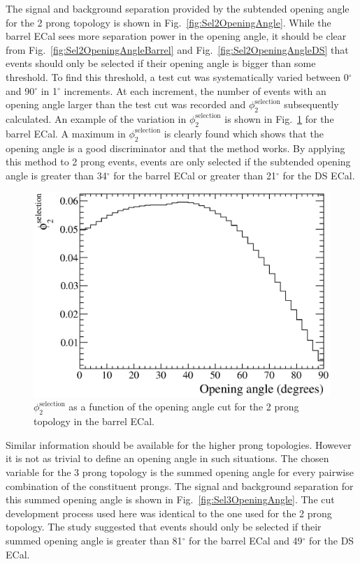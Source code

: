 The signal and background separation provided by the subtended opening angle for the 2 prong topology is shown in Fig.~\ref{fig:Sel2OpeningAngle}.  While the barrel ECal sees more separation power in the opening angle, it should be clear from Fig.~\ref{fig:Sel2OpeningAngleBarrel} and Fig.~\ref{fig:Sel2OpeningAngleDS} that events should only be selected if their opening angle is bigger than some threshold.  To find this threshold, a test cut was systematically varied between 0$^\circ$ and 90$^\circ$ in 1$^\circ$ increments.  At each increment, the number of events with an opening angle larger than the test cut was recorded and $\phi_2^{\textrm{selection}}$ subsequently calculated.  An example of the variation in $\phi_2^{\textrm{selection}}$ is shown in Fig.~\ref{fig:Sel2OpeningAngleBarrelFOM} for the barrel ECal.  A maximum in $\phi_2^{\textrm{selection}}$ is clearly found which shows that the opening angle is a good discriminator and that the method works.  By applying this method to 2 prong events, events are only selected if the subtended opening angle is greater than 34$^\circ$ for the barrel ECal or greater than 21$^\circ$ for the DS ECal.
\begin{figure}
  \centering
  \includegraphics[width=12cm]{images/selection/mc_selection/OpeningAngle_FOM_2Prong_Barrel.eps}
  \caption{$\phi_2^{\textrm{selection}}$ as a function of the opening angle cut for the 2 prong topology in the barrel ECal.}
  \label{fig:Sel2OpeningAngleBarrelFOM}
\end{figure}
Similar information should be available for the higher prong topologies.  However it is not as trivial to define an opening angle in such situations.  The chosen variable for the 3 prong topology is the summed opening angle for every pairwise combination of the constituent prongs.  The signal and background separation for this summed opening angle is shown in Fig.~\ref{fig:Sel3OpeningAngle}.  The cut development process used here was identical to the one used for the 2 prong topology.  The study suggested that events should only be selected if their summed opening angle is greater than 81$^\circ$ for the barrel ECal and 49$^\circ$ for the DS ECal. 
